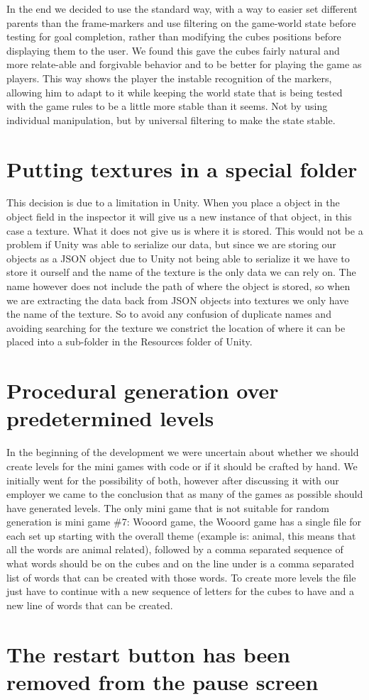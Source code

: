 In the end we decided to use the standard way, with a way to easier set different parents than the frame-markers and use filtering on the game-world state before testing for goal completion, rather than modifying the cubes positions before displaying them to the user. We found this gave the cubes fairly natural and more relate-able and forgivable behavior and to be better for playing the game as players. This way shows the player the instable recognition of the markers, allowing him to adapt to it while keeping the world state that is being tested with the game rules to be a little more stable than it seems. Not by using individual manipulation, but by universal filtering to make the state stable.


\section{Putting textures in a special folder}
This decision is due to a limitation in Unity. When you place a object in the object field in the inspector it will give us a new instance of that object, in this case a texture. What it does not give us is where it is stored. This would not be a problem if Unity was able to serialize our data, but since we are storing our objects as a JSON object due to Unity not being able to serialize it we have to store it ourself and the name of the texture is the only data we can rely on. The name however does not include the path of where the object is stored, so when we are extracting the data back from JSON objects into textures we only have the name of the texture. So to avoid any confusion of duplicate names and avoiding searching for the texture we constrict the location of where it can be placed into a sub-folder in the Resources folder of Unity.

\section{Procedural generation over predetermined levels}
In the beginning of the development we were uncertain about whether we should create levels for the mini games with code or if it should be crafted by hand. We initially went for the possibility of both, however after discussing it with our employer we came to the conclusion that as many of the games as possible should have generated levels. The only mini game that is not suitable for random generation is mini game \#7: Wooord game, the Wooord game has a single file for each set up starting with the overall theme (example is: animal, this means that all the words are animal related), followed by a comma separated sequence of what words should be on the cubes and on the line under is a comma separated list of words that can be created with those words. To create more levels the file just have to continue with a new sequence of letters for the cubes to have and a new line of words that can be created.

\section{The restart button has been removed from the pause screen}
